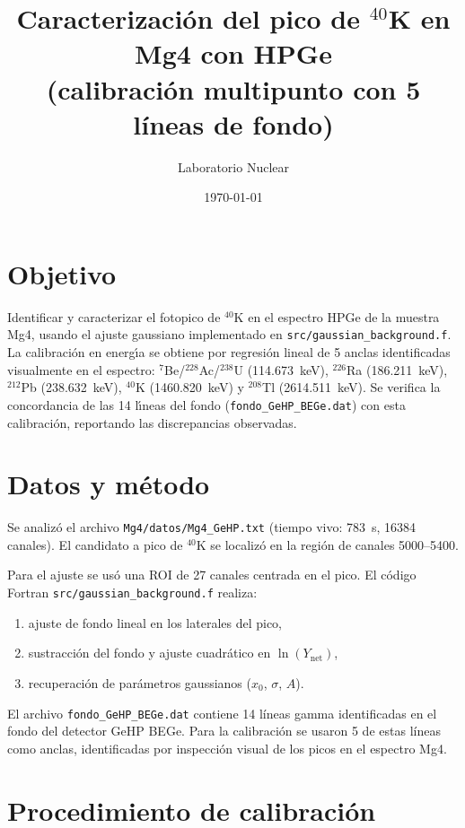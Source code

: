 \documentclass[12pt,a4paper]{article}
\title{Caracterizaci\'on del pico de $^{40}$K en Mg4 con HPGe \\
(calibraci\'on multipunto con 5 l\'ineas de fondo)}
\author{Laboratorio Nuclear}
\date{\today}
\begin{document}
\maketitle

\section*{Objetivo}
Identificar y caracterizar el fotopico de $^{40}$K en el espectro HPGe de la
muestra Mg4, usando el ajuste gaussiano implementado en
\texttt{src/gaussian\_background.f}.
La calibraci\'on en energ\'{\i}a se obtiene por regresi\'on lineal de 5 anclas
identificadas visualmente en el espectro: $^{7}$Be/$^{228}$Ac/$^{238}$U
(114.673~keV), $^{226}$Ra (186.211~keV), $^{212}$Pb (238.632~keV),
$^{40}$K (1460.820~keV) y $^{208}$Tl (2614.511~keV).
Se verifica la concordancia de las 14 l\'{\i}neas del fondo
(\texttt{fondo\_GeHP\_BEGe.dat}) con esta calibraci\'on,
reportando las discrepancias observadas.

\section*{Datos y m\'etodo}
Se analiz\'o el archivo \texttt{Mg4/datos/Mg4\_GeHP.txt}
(tiempo vivo: 783~s, 16384 canales).
El candidato a pico de $^{40}$K se localiz\'o en la regi\'on de canales
5000--5400.

Para el ajuste se us\'o una ROI de 27 canales centrada en el pico.
El c\'odigo Fortran \texttt{src/gaussian\_background.f} realiza:
\begin{enumerate}
  \item ajuste de fondo lineal en los laterales del pico,
  \item sustracci\'on del fondo y ajuste cuadr\'atico en $\ln(Y_{\text{net}})$,
  \item recuperaci\'on de par\'ametros gaussianos ($x_0$, $\sigma$, $A$).
\end{enumerate}

El archivo \texttt{fondo\_GeHP\_BEGe.dat} contiene 14 l\'ineas gamma
identificadas en el fondo del detector GeHP BEGe.
Para la calibraci\'on se usaron 5 de estas l\'ineas como anclas,
identificadas por inspecci\'on visual de los picos en el espectro Mg4.

\section*{Procedimiento de calibraci\'on}
\end{document}
